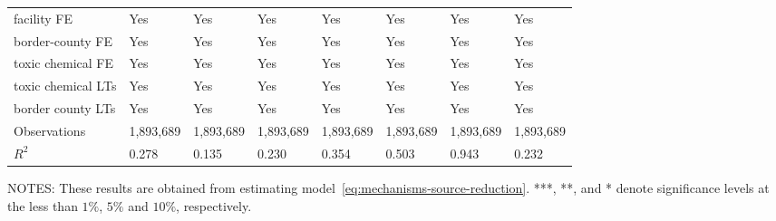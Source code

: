 \begin{table}[H]
{\begin{tabular}{@{}llllllll@{}}
            facility FE        & Yes         & Yes                  & Yes                      & Yes                 & Yes              & Yes       & Yes       \\
            border-county FE   & Yes         & Yes                  & Yes                      & Yes                 & Yes              & Yes       & Yes       \\
            toxic chemical FE  & Yes         & Yes                  & Yes                      & Yes                 & Yes              & Yes       & Yes       \\
            toxic chemical LTs & Yes         & Yes                  & Yes                      & Yes                 & Yes              & Yes       & Yes       \\
            border county LTs  & Yes         & Yes                  & Yes                      & Yes                 & Yes              & Yes       & Yes       \\ \midrule
            Observations       & 1,893,689   & 1,893,689            & 1,893,689                & 1,893,689           & 1,893,689        & 1,893,689 & 1,893,689 \\
            $R^2$              & 0.278       & 0.135                & 0.230                    & 0.354               & 0.503            & 0.943     & 0.232     \\ \bottomrule\bottomrule
        \end{tabular}%
    }
    \begin{minipage}{\columnwidth}
        \vspace{0.05in}
        \tiny NOTES: These results are obtained from estimating model~\ref{eq:mechanisms-source-reduction}. ***, **, and * denote significance levels at the less than $1\%$, $5\%$ and $10\%$, respectively.
    \end{minipage}
\end{table}